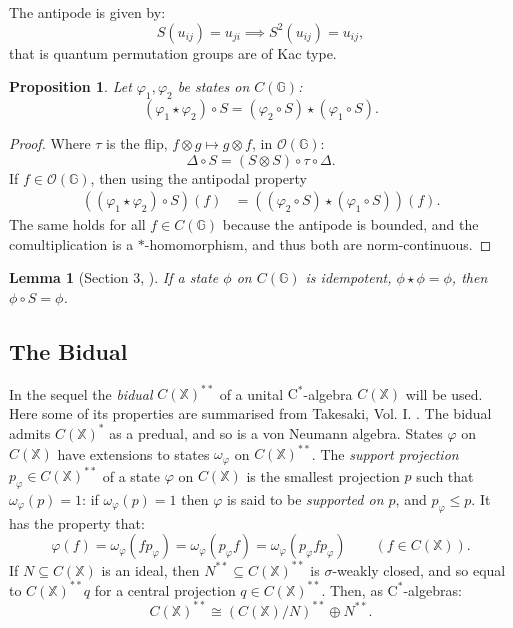 \documentclass[12pt]{amsart}
\newtheorem{proposition}[theorem]{Proposition}
\newtheorem{lemma}[theorem]{Lemma}
\theoremstyle{remark}
\theoremstyle{remark}
\begin{document}
The antipode is given by:
$$S(u_{ij})=u_{ji}\implies S^2(u_{ij})=u_{ij},$$
that is quantum permutation groups are of  Kac type.
\begin{proposition}\label{reverse}
Let $\varphi_1,\varphi_2$ be states on $C(\mathbb{G})$:
$$(\varphi_1\star\varphi_2)\circ S=(\varphi_2\circ S)\star (\varphi_1\circ S).$$
\end{proposition}
\begin{proof}
Where $\tau$ is the flip, $f\otimes g\mapsto g\otimes f$, in $\mathcal{O}(\mathbb{G})$:
$$\Delta\circ S=(S\otimes S)\circ \tau\circ \Delta.$$
If $f\in\mathcal{O}(\mathbb{G})$, then using the antipodal property
\begin{align*}
  ((\varphi_1\star\varphi_2)\circ S)(f) & =((\varphi_2\circ S)\star (\varphi_1\circ S))(f).
\end{align*}
The same holds for all $f\in C(\mathbb{G})$ because the antipode is bounded, and the comultiplication is a $\ast$-homomorphism, and thus both are norm-continuous.
\end{proof}

\begin{lemma}[Section 3, \cite{frs}]\label{idemS}
If a state $\phi$ on $C(\mathbb{G})$ is idempotent, $\phi\star\phi=\phi$, then $\phi\circ S=\phi$.
\end{lemma}

\subsection{The Bidual}\label{bid}
In the sequel the \emph{bidual} $C(\mathbb{X})^{**}$ of a unital $\mathrm{C}^{*}$-algebra $C(\mathbb{X})$ will be used. Here some of its properties are summarised from Takesaki, Vol. I. \cite{ta1}. The bidual admits $C(\mathbb{X})^{*}$ as a predual, and so is a von Neumann algebra. States $\varphi$ on $C(\mathbb{X})$ have extensions to states $\omega_\varphi$ on $C(\mathbb{X})^{**}$.   The \emph{support projection} $p_\varphi\in C(\mathbb{X})^{**}$ of a state $\varphi$ on $C(\mathbb{X})$ is the smallest projection $p$ such that $\omega_\varphi(p)=1$: if $\omega_\varphi(p)=1$ then $\varphi$ is said to be \emph{supported on $p$}, and   $p_\varphi\leq p$. It has the property that:
$$\varphi(f)=\omega_{\varphi}(fp_\varphi)=\omega_{\varphi}(p_\varphi f)=\omega_{\varphi}(p_\varphi fp_\varphi)\qquad (f\in C(\mathbb{X})).$$
If $N\subseteq C(\mathbb{X})$ is an ideal, then $N^{**}\subseteq C(\mathbb{X})^{**}$ is $\sigma$-weakly closed, and so equal to $C(\mathbb{X})^{**}q$ for a central projection $q\in C(\mathbb{X})^{**}$. Then, as $\mathrm{C}^*$-algebras:
\begin{equation}
C(\mathbb{X})^{**}\cong\left(C(\mathbb{X})/N\right)^{**}\oplus N^{**}.\label{directsum}
\end{equation}
\end{document}
